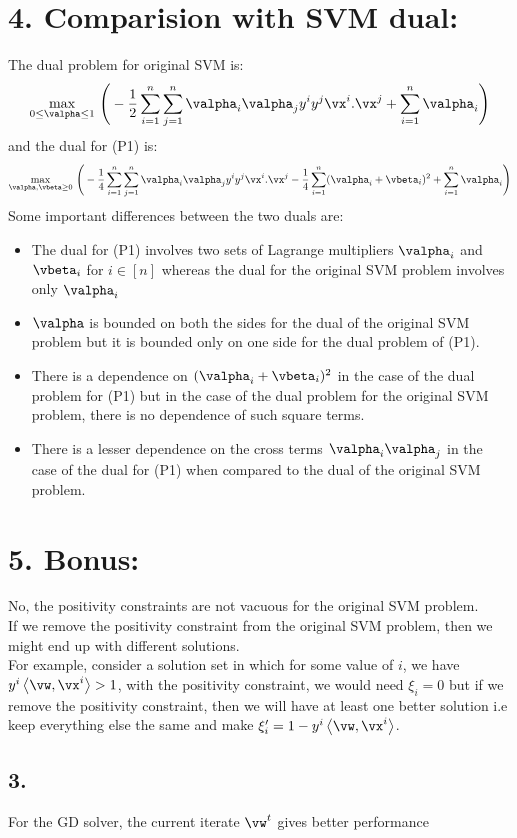 \documentclass[a4paper,11pt]{article}
\begin{document}
\begin{mlsolution}
\section*{4. Comparision with SVM dual:}
The dual problem for original SVM is:
$$\underset{0 \leq \valpha \leq 1}{\max} \ \Bigg( -\frac{1}{2}\sum_{i=1}^n \sum_{j=1}^n\valpha_i\valpha_j y^i y^j {\vx^i.}{\vx^j} + \sum_{i=1}^n\valpha_i \Bigg)   $$ and the dual for (P1) is:
$$ \underset{\valpha,\vbeta \geq 0}{\max} \ \Bigg( -\frac{1}{4}\sum_{i=1}^n \sum_{j=1}^n\valpha_i\valpha_j y^i y^j {\vx^i.}{\vx^j} - \frac{1}{4}\sum_{i=1}^n(\valpha_i+\vbeta_i)^2 + \sum_{i=1}^n\valpha_i \Bigg) $$
Some important differences between the two duals are:
\begin{itemize}
\item The dual for (P1) involves two sets of Lagrange multipliers $\valpha_i$ and $\vbeta_i$ for $i \in [n]$ whereas the dual for the original SVM problem involves only $\valpha_i$
\item $\valpha$ is bounded on both the sides for the dual of the original SVM problem but it is bounded only on one side for the dual problem of (P1).
\item There is a dependence on $(\valpha_i+\vbeta_i)^2$ in the case of the dual problem for (P1) but in the case of the dual problem for the original SVM problem, there is no dependence of such square terms.
\item There is a lesser dependence on the cross terms $\valpha_i\valpha_j$ in the case of the dual for (P1) when compared to the dual of the original SVM problem.
\end{itemize}

\section*{5. Bonus:}
No, the positivity constraints are not vacuous for the original SVM problem.
\\If we remove the positivity constraint from the original SVM problem, then we might end up with different solutions.
\\For example, consider a solution set in which for some value of $i$, we have $y^i\ip{\vw}{\vx^i} > 1$, with the positivity constraint, we would need $\xi_i = 0$ but if we remove the positivity constraint, then we will have at least one better solution i.e keep everything else the same and make $\xi'_i = 1 - y^i\ip{\vw}{\vx^i}$.


\end{mlsolution}

\begin{mlsolution}
\section*{3.}
For the GD solver, the current iterate $\vw^t$ gives better performance

\end{mlsolution}
					
\end{document}
